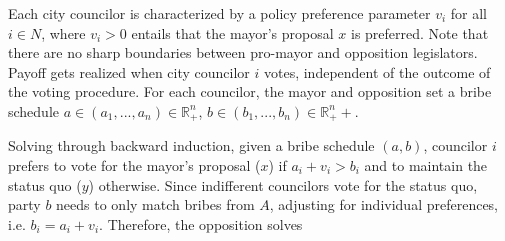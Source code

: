 \documentclass[12pt,a4paper]{article}
\newcommand{\real}{\mathbb{R}_+^n}
\begin{document}
Each city councilor is characterized by a policy preference parameter $v_i$ for all $i \in N$, where $v_i > 0$ entails that the mayor's proposal $x$ is preferred. Note that there are no sharp boundaries between pro-mayor and opposition legislators. Payoff gets realized when city councilor $i$ votes, independent of the outcome of the voting procedure. For each councilor, the mayor and opposition set a bribe schedule $a \in (a_1, ..., a_n) \in \real$, $b \in (b_1, ..., b_n) \in \real+$.

Solving through backward induction, given a bribe schedule $(a, b)$, councilor $i$ prefers to vote for the mayor's proposal ($x$) if $a_i + v_i > b_i$ and to maintain the status quo ($y$) otherwise. Since indifferent councilors vote for the status quo, party $b$ needs to only match bribes from $A$, adjusting for individual preferences, i.e. $b_i = a_i + v_i$. Therefore, the opposition solves
\end{document}
